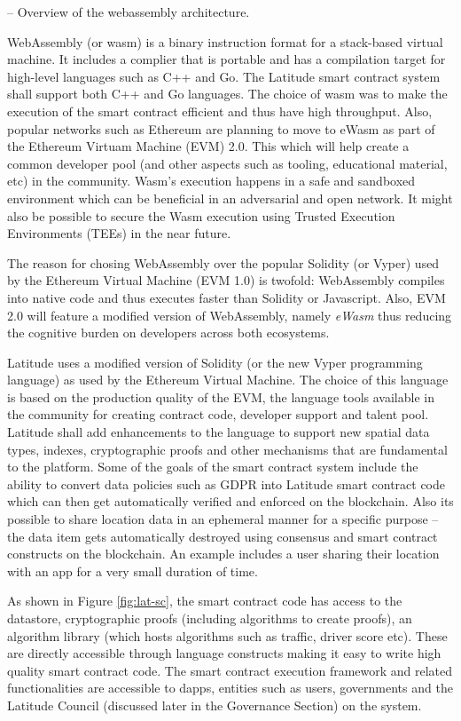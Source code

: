 -- Overview of the webassembly architecture.

WebAssembly (or wasm) is a binary instruction format for a stack-based virtual machine. It includes a complier that is
portable and has a compilation target for high-level languages such as C++ and Go. The Latitude smart contract system
shall support both C++ and Go languages. The choice of wasm was to make the execution of the smart contract efficient
and thus have high throughput. Also, popular networks such as Ethereum are planning to move to eWasm as part of the
Ethereum Virtuam Machine (EVM) 2.0. This which will help create a common developer pool (and other aspects such as
tooling, educational material, etc) in the community. Wasm's execution happens in a safe and sandboxed
environment which can be beneficial in an adversarial and open network. It might also be possible to secure the Wasm
execution using Trusted Execution Environments (TEEs) in the near future.

The reason for chosing WebAssembly over the popular Solidity (or Vyper) used by the Ethereum Virtual Machine (EVM 1.0)
is twofold: 
WebAssembly compiles into native code and thus executes faster than Solidity or Javascript. Also, EVM 2.0 will feature
a modified version of WebAssembly, namely {\it eWasm} thus reducing the cognitive burden on developers across both
ecosystems.

Latitude uses a
modified version of Solidity (or the new Vyper programming language) as used by the Ethereum Virtual Machine. The choice
of this language is based on the production quality of the EVM, the language tools available in the community for
creating contract code, developer support and talent pool. Latitude shall add enhancements to the language to support
new spatial data types, indexes, cryptographic proofs and other mechanisms that are fundamental to the platform. Some of
the goals of the smart contract system include the ability to convert data policies such as GDPR \cite{gdpr} into
Latitude smart contract code which can then get automatically verified and enforced on the blockchain.  Also its
possible to share location data in an ephemeral manner for a specific purpose -- the data item gets automatically
destroyed using consensus and smart contract constructs on the blockchain. An example includes a user sharing their
location with an app for a very small duration of time.

As shown in Figure \ref{fig:lat-sc}, the smart contract code has access to the datastore, cryptographic proofs
(including algorithms to create proofs), an algorithm library (which hosts algorithms such as traffic, driver score
etc). These are directly accessible through language constructs making it easy to write high quality smart contract
code. The smart contract execution framework and related functionalities are accessible to dapps, entities such as
users, governments and the Latitude Council (discussed later in the Governance Section) on the system. 


